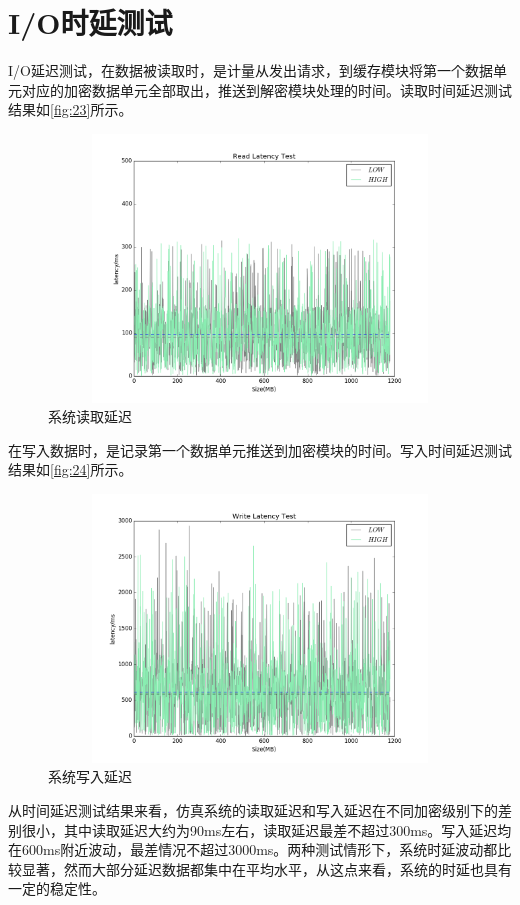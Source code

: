 \section{I/O时延测试}
I/O延迟测试，在数据被读取时，是计量从发出请求，到缓存模块将第一个数据单元对应的加密数据单元全部取出，推送到解密模块处理的时间。读取时间延迟测试结果如\autoref{fig:23}所示。
\begin{figure}[H]
	\centering
	\includegraphics[width=1\textwidth,height=2.8in]{Pics/figure_lat_r.png}
	\caption{系统读取延迟}
	\label{fig:23}
\end{figure}
在写入数据时，是记录第一个数据单元推送到加密模块的时间。写入时间延迟测试结果如\autoref{fig:24}所示。
\begin{figure}[H]
	\centering
	\includegraphics[width=1\textwidth,height=2.8in]{Pics/figure_lat_w.png}
	\caption{系统写入延迟}
	\label{fig:24}
\end{figure}
从时间延迟测试结果来看，仿真系统的读取延迟和写入延迟在不同加密级别下的差别很小，其中读取延迟大约为90ms左右，读取延迟最差不超过300ms。写入延迟均在600ms附近波动，最差情况不超过3000ms。两种测试情形下，系统时延波动都比较显著，然而大部分延迟数据都集中在平均水平，从这点来看，系统的时延也具有一定的稳定性。
